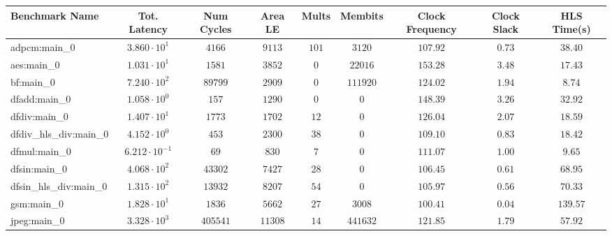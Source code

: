 \begin{tabular}{|l|c|c|c|c|c|c|c|c|}
\hline
Benchmark Name          & Tot. Latency            & Num Cycles & Area LE   & Mults   & Membits    & Clock Frequency & Clock Slack & HLS Time(s) \\
\hline
adpcm:main\_0           & $ 3.860 \cdot 10^{1}  $ & $ 4166   $ & $ 9113  $ & $ 101 $ & $ 3120   $ & $ 107.92      $ & $ 0.73    $ & $ 38.40   $ \\
aes:main\_0             & $ 1.031 \cdot 10^{1}  $ & $ 1581   $ & $ 3852  $ & $ 0   $ & $ 22016  $ & $ 153.28      $ & $ 3.48    $ & $ 17.43   $ \\
bf:main\_0              & $ 7.240 \cdot 10^{2}  $ & $ 89799  $ & $ 2909  $ & $ 0   $ & $ 111920 $ & $ 124.02      $ & $ 1.94    $ & $ 8.74    $ \\
dfadd:main\_0           & $ 1.058 \cdot 10^{0}  $ & $ 157    $ & $ 1290  $ & $ 0   $ & $ 0      $ & $ 148.39      $ & $ 3.26    $ & $ 32.92   $ \\
dfdiv:main\_0           & $ 1.407 \cdot 10^{1}  $ & $ 1773   $ & $ 1702  $ & $ 12  $ & $ 0      $ & $ 126.04      $ & $ 2.07    $ & $ 18.59   $ \\
dfdiv\_hls\_div:main\_0 & $ 4.152 \cdot 10^{0}  $ & $ 453    $ & $ 2300  $ & $ 38  $ & $ 0      $ & $ 109.10      $ & $ 0.83    $ & $ 18.42   $ \\
dfmul:main\_0           & $ 6.212 \cdot 10^{-1} $ & $ 69     $ & $ 830   $ & $ 7   $ & $ 0      $ & $ 111.07      $ & $ 1.00    $ & $ 9.65    $ \\
dfsin:main\_0           & $ 4.068 \cdot 10^{2}  $ & $ 43302  $ & $ 7427  $ & $ 28  $ & $ 0      $ & $ 106.45      $ & $ 0.61    $ & $ 68.95   $ \\
dfsin\_hls\_div:main\_0 & $ 1.315 \cdot 10^{2}  $ & $ 13932  $ & $ 8207  $ & $ 54  $ & $ 0      $ & $ 105.97      $ & $ 0.56    $ & $ 70.33   $ \\
gsm:main\_0             & $ 1.828 \cdot 10^{1}  $ & $ 1836   $ & $ 5662  $ & $ 27  $ & $ 3008   $ & $ 100.41      $ & $ 0.04    $ & $ 139.57  $ \\
jpeg:main\_0            & $ 3.328 \cdot 10^{3}  $ & $ 405541 $ & $ 11308 $ & $ 14  $ & $ 441632 $ & $ 121.85      $ & $ 1.79    $ & $ 57.92   $ \\

\end{tabular}
